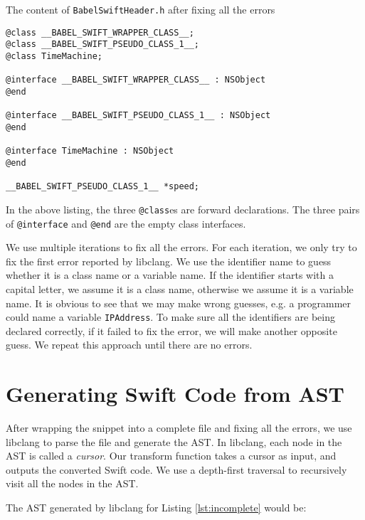 \documentclass{sfuthesis}
\begin{document}
\begin{listing}[H]
\caption{The content of \texttt{BabelSwiftHeader.h} after fixing all the errors}
\begin{verbatim}
@class __BABEL_SWIFT_WRAPPER_CLASS__;
@class __BABEL_SWIFT_PSEUDO_CLASS_1__;
@class TimeMachine;

@interface __BABEL_SWIFT_WRAPPER_CLASS__ : NSObject
@end

@interface __BABEL_SWIFT_PSEUDO_CLASS_1__ : NSObject
@end

@interface TimeMachine : NSObject
@end

__BABEL_SWIFT_PSEUDO_CLASS_1__ *speed;
\end{verbatim}
\end{listing}

In the above listing, the three \texttt{@class}es are forward declarations. The three pairs of \texttt{@interface} and \texttt{@end} are the empty class interfaces.

We use multiple iterations to fix all the errors. For each iteration, we only try to fix the first error reported by libclang. We use the identifier name to guess whether it is a class name or a variable name. If the identifier starts with a capital letter, we assume it is a class name, otherwise we assume it is a variable name. It is obvious to see that we may make wrong guesses, e.g. a programmer could name a variable \texttt{IPAddress}. To make sure all the identifiers are being declared correctly, if it failed to fix the error, we will make another opposite guess. We repeat this approach until there are no errors.


\section{Generating Swift Code from AST}

After wrapping the snippet into a complete file and fixing all the errors, we use libclang to parse the file and generate the AST. In libclang, each node in the AST is called a \emph{cursor}. Our transform function takes a cursor as input, and outputs the converted Swift code. We use a depth-first traversal to recursively visit all the nodes in the AST.

The AST generated by libclang for Listing \ref{lst:incomplete} would be:
\end{document}
